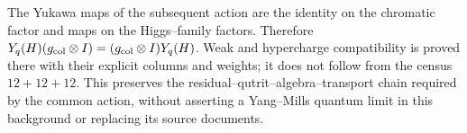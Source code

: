 The Yukawa maps of the subsequent action are the identity on the chromatic factor and maps on the Higgs--family factors. Therefore \(Y_q(H)(g_{\rm col}\otimes I)
=(g_{\rm col}\otimes I)Y_q(H)\). Weak and hypercharge compatibility is proved there with their explicit columns and weights; it does not follow from the census \(12+12+12\). This preserves the residual--qutrit--algebra--transport chain required by the common action, without asserting a Yang--Mills quantum limit in this background or replacing its source documents.
